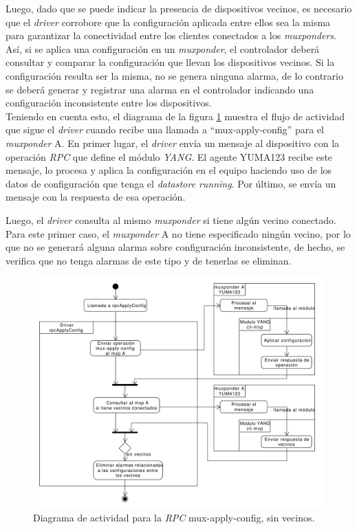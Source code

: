   Luego, dado que se puede indicar la presencia de dispositivos vecinos, es necesario que el \textit{driver} corrobore que la configuración aplicada entre ellos sea la misma para garantizar la conectividad entre los clientes conectados a los \textit{muxponders}. Así, si se aplica una configuración en un \textit{muxponder}, el controlador deberá consultar y comparar la configuración que llevan los dispositivos vecinos. Si la configuración resulta ser la misma, no se genera ninguna alarma, de lo contrario se deberá generar y registrar una alarma en el controlador indicando una configuración inconsistente entre los dispositivos.
  \\

  Teniendo en cuenta esto, el diagrama de la figura \ref{fig:actividad_driver_rpc_sin_vecinos} muestra el flujo de actividad que sigue el \textit{driver} cuando recibe una llamada a “mux-apply-config” para el \textit{muxponder} A. 
  En primer lugar, el \textit{driver} envía un mensaje al dispositivo con la operación \textit{RPC} que define el módulo \textit{YANG}. El agente YUMA123 recibe este mensaje, lo procesa y aplica la configuración en el equipo haciendo uso de los datos de configuración que tenga el \textit{datastore running}. Por último, se envía un mensaje con la respuesta de esa operación.  

  Luego, el \textit{driver} consulta al mismo \textit{muxponder} si tiene algún vecino conectado. Para este primer caso, el \textit{muxponder} A no tiene especificado ningún vecino, por lo que no se generará alguna alarma sobre configuración inconsistente, de hecho, se verifica que no tenga alarmas de este tipo y de tenerlas se eliminan.


  \begin{figure}[H]
    \centering
    \includegraphics[scale=0.45]{Figures/actividad_driver_rpc_sin_vecinos.pdf}
    \caption{Diagrama de actividad para la \textit{RPC} mux-apply-config, sin vecinos.}
    \label{fig:actividad_driver_rpc_sin_vecinos}
  \end{figure}


